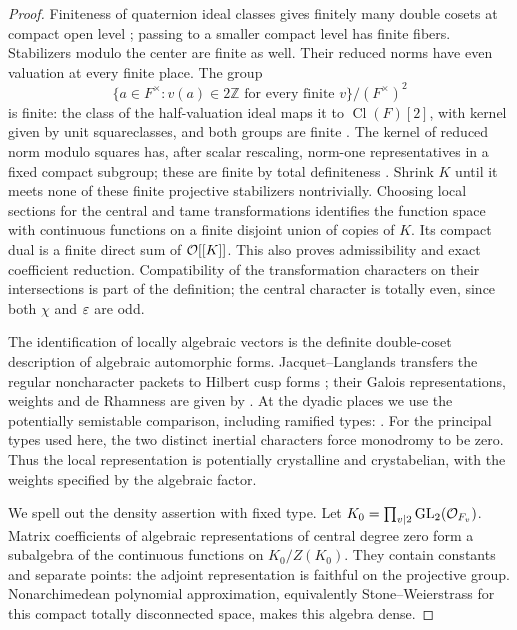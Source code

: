 \begin{proof}
Finiteness of quaternion ideal classes gives finitely many double
cosets at compact open level \cite[Main Theorem~17.7.1]{Voight2021};
passing to a smaller compact level has finite fibers. Stabilizers
modulo the center are finite as well. Their reduced norms have even
valuation at every finite place. The group
\[
 \{a\in F^\times:v(a)\in2\mathbb Z\text{ for every finite }v\}
       /(F^\times)^2
\]
is finite: the class of the half-valuation ideal maps it to
\(\operatorname{Cl}(F)[2]\), with kernel given by unit squareclasses,
and both groups are finite \cite[Theorems~4.4 and~5.1]{MilneANT}.
The kernel of reduced norm modulo squares has, after scalar
rescaling, norm-one representatives in a fixed compact subgroup;
these are finite by total definiteness
\cite[Lemma~17.7.13]{Voight2021}. Shrink \(K\) until
it meets none of these finite projective stabilizers
nontrivially. Choosing local sections for the central and
tame transformations identifies the function space with
continuous functions on a finite disjoint union of copies
of \(K\). Its compact dual is a finite direct sum of
\(\mathcal O[[K]]\). This also proves admissibility and exact
coefficient reduction. Compatibility of the transformation
characters on their intersections is part of the definition;
the central character is totally even, since both \(\chi\)
and \(\varepsilon\) are odd.

The identification of locally algebraic vectors is the
definite double-coset description of algebraic automorphic
forms. Jacquet--Langlands transfers the regular noncharacter
packets to Hilbert cusp forms
\cite[Theorems~14.4 and 16.1]{JacquetLanglands1970}; their
Galois representations, weights and de Rhamness are given by
\cite[Theorem~2.1.1]{BLGGT2014}. At the dyadic places we use the potentially
semistable comparison, including ramified types:
\cite[Corollary~1.2]{BLGGTLocalGlobal2014}. For the principal
types used here, the two distinct inertial characters
force monodromy to be zero. Thus the local representation
is potentially crystalline and crystabelian, with the
weights specified by the algebraic factor.

We spell out the density assertion with fixed type.
Let \(K_0=\prod_{v\mid2}\operatorname{GL}_2(\mathcal O_{F_v})\).
Matrix coefficients of algebraic representations of
central degree zero form a subalgebra of the continuous
functions on \(K_0/Z(K_0)\). They contain constants and
separate points: the adjoint representation is faithful
on the projective group. Nonarchimedean polynomial
approximation, equivalently Stone--Weierstrass for this
compact totally disconnected space, makes this algebra
dense.


\end{proof}
